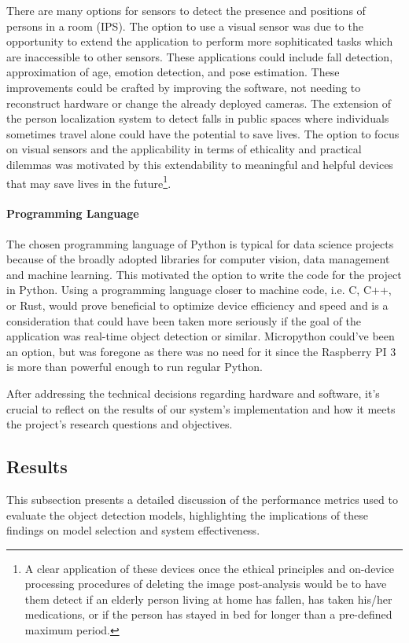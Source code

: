 There are many options for sensors to detect the presence and positions of persons in a room (IPS). The option to use a visual sensor was due to the opportunity to extend the application to perform more sophiticated tasks which are inaccessible to other sensors. These applications could include fall detection, approximation of age, emotion detection, and pose estimation. These improvements could be crafted by improving the software, not needing to reconstruct hardware or change the already deployed cameras. The extension of the person localization system to detect falls in public spaces where individuals sometimes travel alone could have the potential to save lives. The option to focus on visual sensors and the applicability in terms of ethicality and practical dilemmas was motivated by this extendability to meaningful and helpful devices that may save lives in the future\footnote{A clear application of these devices once the ethical principles and on-device processing procedures of deleting the image post-analysis would be to have them detect if an elderly person living at home has fallen, has taken his/her medications, or if the person has stayed in bed for longer than a pre-defined maximum period.}. 

\paragraph{Programming Language}
The chosen programming language of Python is typical for data science projects because of the broadly adopted libraries for computer vision, data management and machine learning. This motivated the option to write the code for the project in Python. Using a programming language closer to machine code, i.e. C, C++, or Rust, would prove beneficial to optimize device efficiency and speed and is a consideration that could have been taken more seriously if the goal of the application was real-time object detection or similar. Micropython could've been an option, but was foregone as there was no need for it since the Raspberry PI 3 is more than powerful enough to run regular Python.  

After addressing the technical decisions regarding hardware and software, it's crucial to reflect on the results of our system's implementation and how it meets the project's research questions and objectives.

\subsection{Results}
\label{sec:results_discussion}
This subsection presents a detailed discussion of the performance metrics used to evaluate the object detection models, highlighting the implications of these findings on model selection and system effectiveness. 

